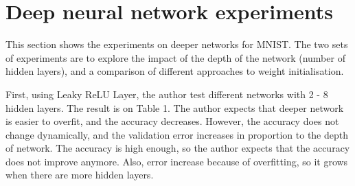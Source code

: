 \documentclass{article}
\begin{document}

\section{Deep neural network experiments}
\label{sec:dnnexpts}
This section shows the experiments on deeper networks for MNIST.  The two sets of experiments are to explore the impact of the depth of the network (number of hidden layers), and a comparison of different approaches to weight initialisation.

First, using Leaky ReLU Layer, the author test different networks with 2 - 8 hidden layers. The result is on Table 1.
The author expects that deeper network is easier to overfit, and the accuracy decreases. However, the accuracy does not change dynamically, and the validation error increases in proportion to the depth of network.
The accuracy is high enough, so the author expects that the accuracy does not improve anymore. Also, error increase because of overfitting, so it grows when there are more hidden layers.
\end{document}
